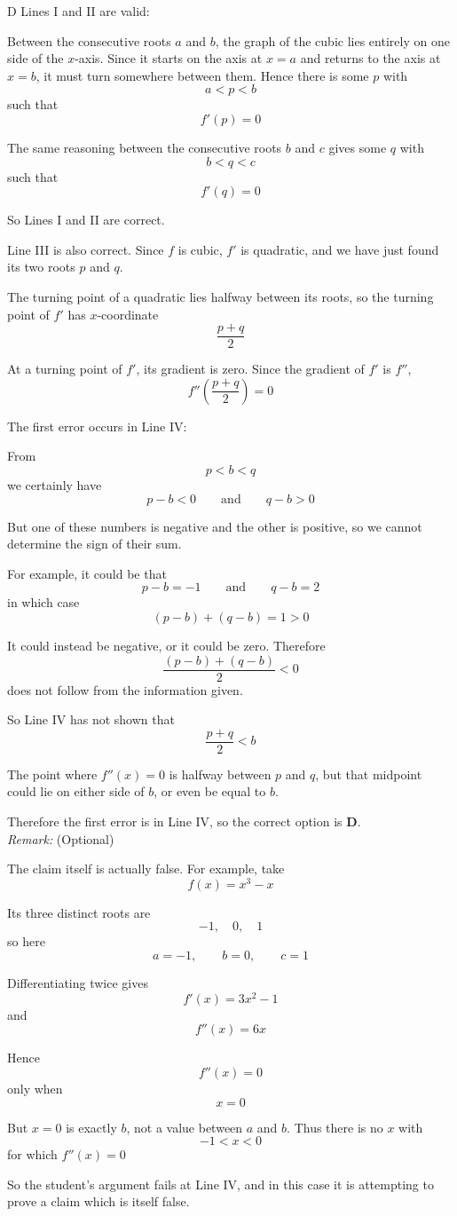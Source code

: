 \documentclass[11pt,a4paper]{article}
\begin{document}
\begin{enumerate}[label=\textbf{\arabic*.},leftmargin=*,itemsep=0pt,start=12]
\begin{djsSolution}{D}
Lines I and II are valid:

Between the consecutive roots \(a\) and \(b\), the graph of the cubic lies entirely on one side of the \(x\)-axis. Since it starts on the axis at \(x=a\) and returns to the axis at \(x=b\), it must turn somewhere between them. Hence there is some \(p\) with
\[
a<p<b
\]
such that
\[
f'(p)=0
\]

The same reasoning between the consecutive roots \(b\) and \(c\) gives some \(q\) with
\[
b<q<c
\]
such that
\[
f'(q)=0
\]

So Lines I and II are correct.

Line III is also correct. Since \(f\) is cubic, \(f'\) is quadratic, and we have just found its two roots \(p\) and \(q\).

The turning point of a quadratic lies halfway between its roots, so the turning point of \(f'\) has \(x\)-coordinate
\[
\frac{p+q}{2}
\]

At a turning point of \(f'\), its gradient is zero. Since the gradient of \(f'\) is \(f''\),
\[
f''\!\left(\frac{p+q}{2}\right)=0
\]

The first error occurs in Line IV:

From
\[
p<b<q
\]
we certainly have
\[
p-b<0
\qquad\text{and}\qquad
q-b>0
\]

But one of these numbers is negative and the other is positive, so we cannot determine the sign of their sum.

For example, it could be that
\[
p-b=-1
\qquad\text{and}\qquad
q-b=2
\]
in which case
\[
(p-b)+(q-b)=1>0
\]

It could instead be negative, or it could be zero. Therefore
\[
\frac{(p-b)+(q-b)}{2}<0
\]
does not follow from the information given.

So Line IV has not shown that
\[
\frac{p+q}{2}<b
\]

The point where \(f''(x)=0\) is halfway between \(p\) and \(q\), but that midpoint could lie on either side of \(b\), or even be equal to \(b\).

Therefore the first error is in Line IV, so the correct option is \textbf{D}.\\[5pt]

\textit{Remark:} (Optional)

The claim itself is actually false. For example, take
\[
f(x)=x^3-x
\]

Its three distinct roots are
\[
-1,\quad 0,\quad 1
\]
so here
\[
a=-1,\qquad b=0,\qquad c=1
\]

Differentiating twice gives
\[
f'(x)=3x^2-1
\]
and
\[
f''(x)=6x
\]

Hence
\[
f''(x)=0
\]
only when
\[
x=0
\]

But \(x=0\) is exactly \(b\), not a value between \(a\) and \(b\). Thus there is no \(x\) with
\[
-1<x<0
\]
for which \(f''(x)=0\)

So the student's argument fails at Line IV, and in this case it is attempting to prove a claim which is itself false.
\end{djsSolution}
\end{enumerate}
\end{document}
